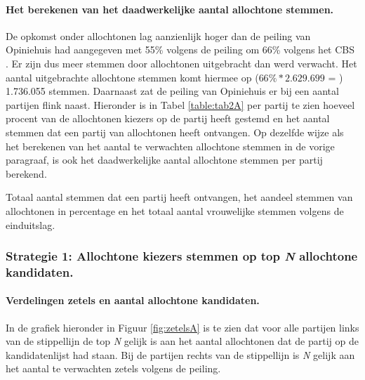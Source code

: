\paragraph{Het berekenen van het daadwerkelijke aantal allochtone stemmen.}

De opkomst onder allochtonen lag aanzienlijk hoger dan de peiling van Opiniehuis \citeyearpar{Opiniehuis} had aangegeven met 55\% volgens de peiling om 66\% volgens het CBS \citeyearpar{CBS_stemgedrag}. Er zijn dus meer stemmen door allochtonen uitgebracht dan werd verwacht. Het aantal uitgebrachte allochtone stemmen komt hiermee op ($66\%*2.629.699$ = ) 1.736.055 stemmen. Daarnaast zat de peiling van Opiniehuis er bij een aantal partijen flink naast.  Hieronder is in Tabel \ref{table:tab2A} per partij te zien hoeveel procent van de allochtonen kiezers op de partij heeft gestemd en het aantal stemmen dat een partij van allochtonen heeft ontvangen. Op dezelfde wijze als het berekenen van het aantal te verwachten allochtone stemmen in de vorige paragraaf, is ook het daadwerkelijke aantal allochtone stemmen per partij berekend.
    
\begin{table}[h]
\centering
	\begin{footnotesize}
		
	\end{footnotesize}
			\caption{Totaal aantal stemmen dat een partij heeft ontvangen, het aandeel stemmen van allochtonen in percentage en het totaal aantal vrouwelijke stemmen volgens de einduitslag.}
\label{table:tab2A} 
\end{table}
    
\newpage
\subsubsection{Strategie 1: Allochtone kiezers stemmen op top \textit{N} allochtone kandidaten.} \label{S1A}



\paragraph{Verdelingen zetels en aantal allochtone kandidaten.}
In de grafiek hieronder in Figuur \ref{fig:zetelsA} is te zien dat voor alle partijen links van de stippellijn de top \textit{N} gelijk is aan het aantal allochtonen dat de partij op de kandidatenlijst had staan. Bij de partijen rechts van de stippellijn is \textit{N} gelijk aan het aantal te verwachten zetels volgens de peiling. 
 
